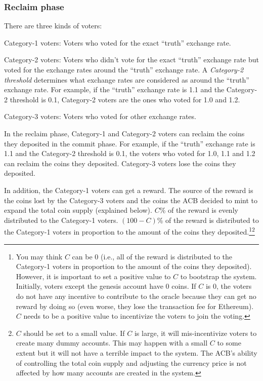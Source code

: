 \documentclass[dvipdfmx,a4paper]{article}
\begin{document}
\subsubsection{Reclaim phase}

There are three kinds of voters:

\begin{description}
\item{Category-1 voters}: Voters who voted for the exact ``truth'' exchange rate.
\item{Category-2 voters}: Voters who didn't vote for the exact ``truth'' exchange rate but voted for the exchange rates around the ``truth'' exchange rate. A \textit{Category-2 threshold} determines what exchange rates are considered as around the ``truth'' exchange rate. For example, if the ``truth'' exchange rate is 1.1 and the Category-2 threshold is 0.1, Category-2 voters are the ones who voted for 1.0 and 1.2.
\item{Category-3 voters}: Voters who voted for other exchange rates.
\end{description}

In the reclaim phase, Category-1 and Category-2 voters can reclaim the coins they deposited in the commit phase. For example, if the ``truth'' exchange rate is 1.1 and the Category-2 threshold is 0.1, the voters who voted for 1.0, 1.1 and 1.2 can reclaim the coins they deposited. Category-3 voters lose the coins they deposited.

In addition, the Category-1 voters can get a reward. The source of the reward is the coins lost by the Category-3 voters and the coins the ACB decided to mint to expand the total coin supply (explained below). $C$\% of the reward is evenly distributed to the Category-1 voters. $(100-C)$\% of the reward is distributed to the Category-1 voters in proportion to the amount of the coins they deposited.\footnote{You may think $C$ can be 0 (i.e., all of the reward is distributed to the Category-1 voters in proportion to the amount of the coins they deposited). However, it is important to set a positive value to $C$ to bootstrap the system. Initially, voters except the genesis account have 0 coins. If $C$ is 0, the voters do not have any incentive to contribute to the oracle because they can get no reward by doing so (even worse, they lose the transaction fee for Ethereum). $C$ needs to be a positive value to incentivize the voters to join the voting.}\footnote{$C$ should be set to a small value. If $C$ is large, it will mis-incentivize voters to create many dummy accounts. This may happen with a small $C$ to some extent but it will not have a terrible impact to the system. The ACB's ability of controlling the total coin supply and adjusting the currency price is not affected by how many accounts are created in the system.}
\end{document}
